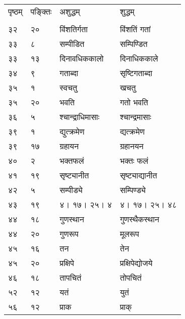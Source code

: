 \documentclass[11pt, openany]{book}
\begin{document}
\begin{longtable}{p{1cm} p{1.5cm} p{4cm} p{4cm}}
\newpage




पृष्ठम् & पङ्क्तिः &  अशुद्धम् & शुद्धम्\\
\vspace{2mm}\\

 ३२ & २० & विंशतिर्गता & विंशतिं गतां\\

 ३३ & ८ & सम्पीडित & सम्पिण्डित\\

 ३३ & १३ & दिनावधिककालो & दिनाधिककाले\\

 ३४ & ९ & गताब्दा & सृष्टिगताब्दा\\

 ३५ & १ & स्वचतु & खचतु\\

 ३५ & २० & भवति & गतो भवति\\

 ३६ & ५ & श्चान्द्राधिमासाः & श्चान्द्रमासाः\\ 

 ३९ & १ & द्युत्क्रमेण & द्यत्क्रमेण\\

 ३९ & १७ &  ग्रहायन & ग्रहानयन\\

 ४० & २ & भक्तफलं & भक्तः फलं\\

 ४१ & १९ & सृष्ट्यानीत & सृष्ट्याद्यानीत \\

 ४२ & ५ & सम्पीड्ये & सम्पिण्ड्ये\\

 ४३ & १९ & ४। १७। २५। ४ & ४। १७। २५। ४८\\

 ४४ & १८ & गुणस्थान & गुणस्थैकस्थान\\

 ४४ & २० & गुणरूप & मूलरूप\\

 ४५ & १६ & तन & तेन\\

 ४५ & २० & प्रक्षिपे & प्रक्षिपेद्योजये\\

 ४६ & १८ & तापचितं & तोपचितं\\

 ५२ & १२ & यतं & युतं\\

 ५६ & १२ & प्राक & प्राक्\\


\end{longtable}
\end{document}
